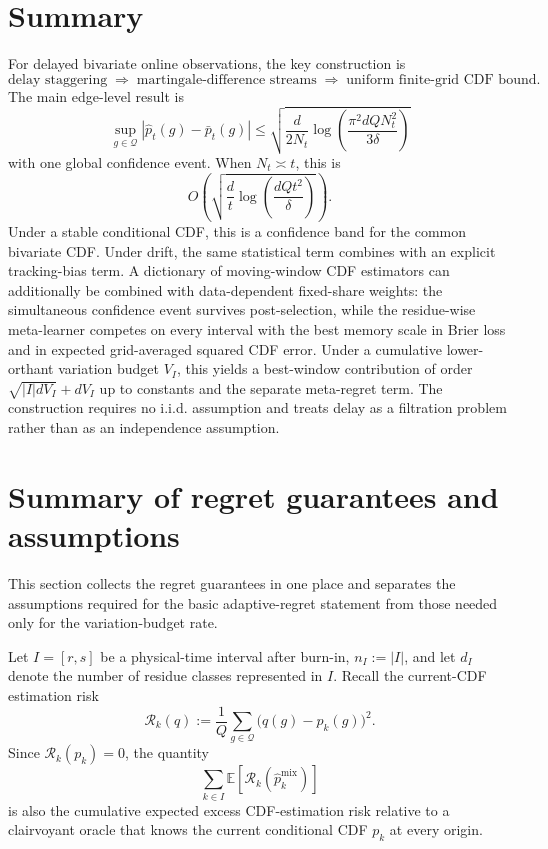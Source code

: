 \documentclass[11pt]{article}
\newcommand{\E}{\mathbb{E}}
\newcommand{\Q}{\mathcal{Q}}
\newcommand{\1}{\mathbf{1}}
\begin{document}
\section{Summary}

For delayed bivariate online observations, the key construction is
\[
    \text{delay staggering}
    \;\Longrightarrow\;
    \text{martingale-difference streams}
    \;\Longrightarrow\;
    \text{uniform finite-grid CDF bound}.
\]
The main edge-level result is
\[
    \sup_{g\in\Q}
    |\widehat p_t(g)-\bar p_t(g)|
    \le
    \sqrt{
        \frac{d}{2N_t}
        \log\!\left(
            \frac{\pi^2 dQ N_t^2}{3\delta}
        \right)
    }
\]
with one global confidence event.  When $N_t\asymp t$, this is
\[
    O\!\left(
        \sqrt{
            \frac{d}{t}
            \log\!\left(\frac{dQt^2}{\delta}\right)
        }
    \right).
\]  Under a stable conditional CDF, this is a
confidence band for the common bivariate CDF.  Under drift, the same statistical
term combines with an explicit tracking-bias term.  A dictionary of moving-window
CDF estimators can additionally be combined with data-dependent fixed-share
weights: the simultaneous confidence event survives post-selection, while the
residue-wise meta-learner competes on every interval with the best memory scale
in Brier loss and in expected grid-averaged squared CDF error.  Under a cumulative
lower-orthant variation budget $V_I$, this yields a best-window contribution of
order $\sqrt{|I|dV_I}+dV_I$ up to constants and the separate meta-regret term.
The construction requires no i.i.d. assumption and treats delay as a filtration problem rather
than as an independence assumption.

\section{Summary of regret guarantees and assumptions}
\label{sec:regret-summary}

This section collects the regret guarantees in one place and separates the
assumptions required for the basic adaptive-regret statement from those needed
only for the variation-budget rate.

Let $I=[r,s]$ be a physical-time interval after burn-in,
$n_I:=|I|$, and let $d_I$ denote the number of residue classes represented in
$I$.  Recall the current-CDF estimation risk
\[
    \mathcal R_k(q)
    :=
    \frac1Q
    \sum_{g\in\Q}
    \bigl(q(g)-p_k(g)\bigr)^2.
\]
Since $\mathcal R_k(p_k)=0$, the quantity
\[
    \sum_{k\in I}
    \E\!\left[
        \mathcal R_k(\widehat p_k^{\mathrm{mix}})
    \right]
\]
is also the cumulative expected excess CDF-estimation risk relative to a
clairvoyant oracle that knows the current conditional CDF $p_k$ at every
origin.
\end{document}
